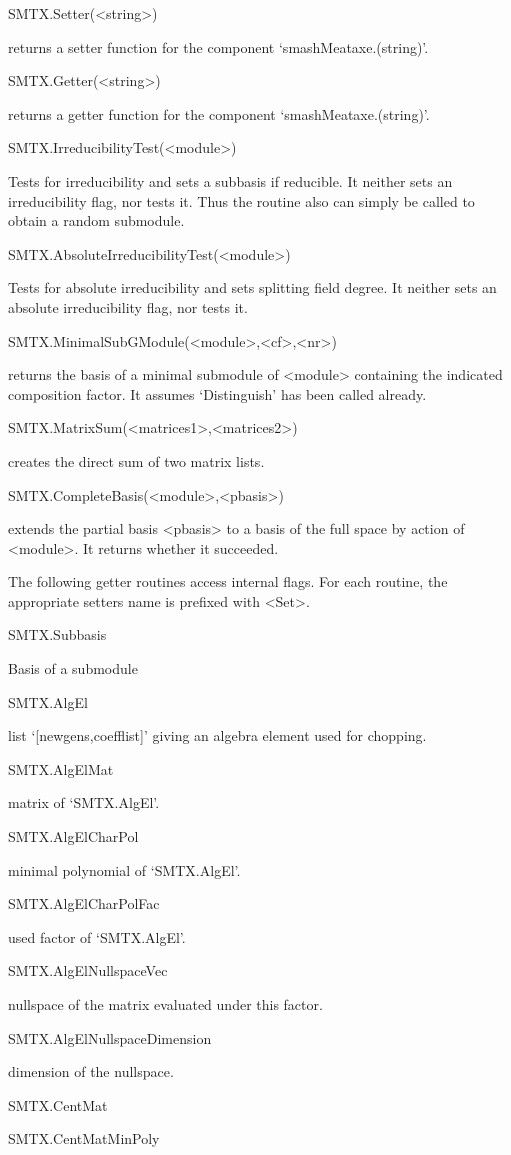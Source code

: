 \>SMTX.Setter(<string>)

returns a setter function for the component `smashMeataxe.(string)'.

\>SMTX.Getter(<string>)

returns a getter function for the component `smashMeataxe.(string)'.

\>SMTX.IrreducibilityTest(<module>)

Tests for irreducibility and sets a subbasis if reducible. It neither sets
an irreducibility flag, nor tests it. Thus the routine also can simply be
called to obtain a random submodule.

\>SMTX.AbsoluteIrreducibilityTest(<module>)

Tests for absolute irreducibility and sets splitting field degree. It
neither sets an absolute irreducibility flag, nor tests it.

\>SMTX.MinimalSubGModule(<module>,<cf>,<nr>)

returns the basis of a minimal submodule of <module> containing the
indicated composition factor. It assumes `Distinguish' has been called
already.

\>SMTX.MatrixSum(<matrices1>,<matrices2>)

creates the direct sum of two matrix lists.

\>SMTX.CompleteBasis(<module>,<pbasis>)

extends the partial basis <pbasis> to a basis of the full space
by action of <module>. It returns whether it succeeded.


The following getter routines access internal flags. For each routine, the
appropriate setters name is prefixed with <Set>.

\>SMTX.Subbasis

Basis of a submodule

\>SMTX.AlgEl

list `[newgens,coefflist]' giving an algebra element used for chopping.

\>SMTX.AlgElMat

matrix of `SMTX.AlgEl'.

\>SMTX.AlgElCharPol

minimal polynomial of `SMTX.AlgEl'.

\>SMTX.AlgElCharPolFac

used factor of `SMTX.AlgEl'.

\>SMTX.AlgElNullspaceVec

nullspace of the matrix evaluated under this factor.

\>SMTX.AlgElNullspaceDimension

dimension of the nullspace.

\>SMTX.CentMat


\>SMTX.CentMatMinPoly


